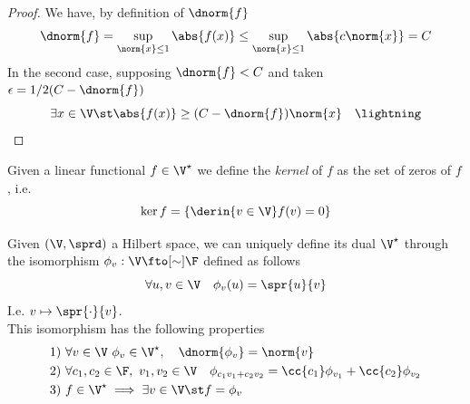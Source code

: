 \documentclass[../mmf.tex]{subfiles}
\begin{document}
\begin{proof}
	We have, by definition of $\dnorm{f}$
	\begin{equation*}
		\dnorm{f}=\sup_{\norm{x}\le1}\abs{f(x)}\le\sup_{\norm{x}\le1}\abs{c\norm{x}}=C
	\end{equation*}
	In the second case, supposing $\dnorm{f}<C$ and taken $\epsilon=1/2(C-\dnorm{f})$
	\begin{equation*}
		\exists x\in\V\st\abs{f(x)}\ge(C-\dnorm{f})\norm{x}\quad\lightning
	\end{equation*}
\end{proof}
\begin{dfn}[Kernel]
	Given a linear functional $f\in\V^\star$ we define the \textit{kernel} of $f$ as the set of zeros of $f$, i.e.
	\begin{equation}
		\ker f=\left\{ \derin{v\in\V}f(v)=0 \right\}
		\label{eq:kernel}
	\end{equation}
\end{dfn}
\begin{thm}
	Given $(\V,\sprd)$ a Hilbert space, we can uniquely define its dual $\V^\star$ through the isomorphism $\phi_v:\V\fto[\sim]\F$ defined as follows
	\begin{equation*}
		\forall u,v\in\V\quad\phi_v(u)=\spr{u}{v}
	\end{equation*}
	I.e. $v\mapsto\spr{\cdot}{v}$.\\
	This isomorphism has the following properties
	\begin{equation}
		\begin{aligned}
			1)&\ \forall v\in\V\ \phi_v\in\V^\star,\quad\dnorm{\phi_v}=\norm{v}\\
			2)&\ \forall c_1,c_2\in\F,\ v_1,v_2\in\V\quad\phi_{c_1v_1+c_2v_2}=\cc{c_1}\phi_{v_1}+\cc{c_2}\phi_{v_2}\\
			3)&\ f\in\V^\star\implies{}\exists v\in\V\st f=\phi_v
		\end{aligned}
		\label{eq:rieszthm}
	\end{equation}
\end{thm}
\end{document}
